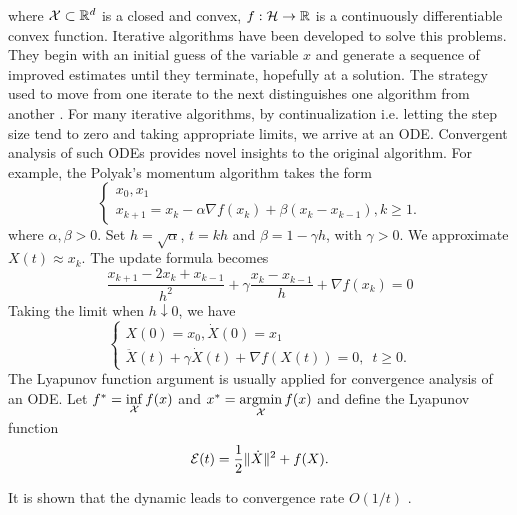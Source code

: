 where $\mathcal{X}\subset{\mathbb{R}}^d$ is a closed and convex, $f:\mathcal{H}\to{\mathbb{R}}$ is a continuously differentiable convex function. Iterative algorithms have been developed to solve this problems. They begin with an initial guess of the variable $x$ and generate a sequence of improved estimates until they terminate, hopefully at a solution. The strategy used to move from one iterate to the next distinguishes one algorithm from another \cite{nocedal1999numerical}. For many iterative algorithms, by continualization i.e. letting the step size tend to zero and taking appropriate limits, we arrive at an ODE. Convergent analysis of such ODEs provides novel insights to the original algorithm. For example, the Polyak's momentum algorithm takes the form
\begin{equation}
    \begin{cases}
        x_0, x_1 \\
        x_{k+1} = x_k - \alpha\nabla f(x_k) + \beta(x_{k}-x_{k-1}), k \ge 1.
    \end{cases}
\end{equation}
where $\alpha,\beta>0$. Set $h=\sqrt{\alpha}$, $t=kh$ and $\beta = 1 -\gamma h$, with $\gamma>0$. We approximate $X(t) \approx x_k$. The update formula becomes
$$\dfrac{x_{k+1} - 2x_{k} + x_{k-1}}{h^2} + \gamma \dfrac{x_k - x_{k-1}}{h} + \nabla f(x_k) = 0$$
Taking the limit when $h\downarrow 0$, we have
\begin{equation}
    \begin{cases}
        X(0) = x_0, \dot{X}(0) = x_1 \\
        \ddot{X}(t) + \gamma \dot{X}(t) + \nabla f(X(t)) = 0, \,\,\, t\ge 0.
    \end{cases}
\end{equation}
The Lyapunov function argument is usually applied for convergence analysis of an ODE. Let $f^* = \inf\limits_{\mathcal{X}} f(x)$ and $x^* = \operatorname*{argmin}\limits_{\mathcal{X}} f(x)$ and define the Lyapunov function
\begin{equation}
    \mathcal{E}(t) = \dfrac{1}{2}\|\dot{X}\|^2 + f(X).
\end{equation}

It is shown that the dynamic leads to convergence rate $O\left(1/t\right)$ \cite{alvarez2000minimizing}.




